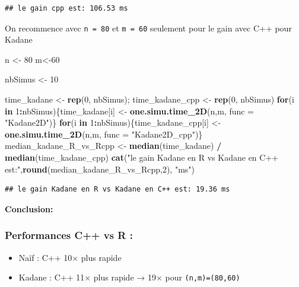 \documentclass[
]{article}
\newenvironment{Shaded}{\begin{snugshade}}{\end{snugshade}}
\newcommand{\AttributeTok}[1]{\textcolor[rgb]{0.13,0.29,0.53}{#1}}
\newcommand{\ControlFlowTok}[1]{\textcolor[rgb]{0.13,0.29,0.53}{\textbf{#1}}}
\newcommand{\DecValTok}[1]{\textcolor[rgb]{0.00,0.00,0.81}{#1}}
\newcommand{\FunctionTok}[1]{\textcolor[rgb]{0.13,0.29,0.53}{\textbf{#1}}}
\newcommand{\NormalTok}[1]{#1}
\newcommand{\OtherTok}[1]{\textcolor[rgb]{0.56,0.35,0.01}{#1}}
\newcommand{\SpecialCharTok}[1]{\textcolor[rgb]{0.81,0.36,0.00}{\textbf{#1}}}
\newcommand{\StringTok}[1]{\textcolor[rgb]{0.31,0.60,0.02}{#1}}
\providecommand{\tightlist}{%
  \setlength{\itemsep}{0pt}\setlength{\parskip}{0pt}}
\begin{document}
\begin{verbatim}
## le gain cpp est: 106.53 ms
\end{verbatim}

On recommence avec \texttt{n\ =\ 80} et \texttt{m\ =\ 60} seulement pour
le gain avec C++ pour Kadane

\begin{Shaded}
\begin{Highlighting}[]
\NormalTok{n }\OtherTok{\textless{}{-}} \DecValTok{80}
\NormalTok{m}\OtherTok{\textless{}{-}}\DecValTok{60}

\NormalTok{nbSimus }\OtherTok{\textless{}{-}} \DecValTok{10}

\NormalTok{time\_kadane }\OtherTok{\textless{}{-}} \FunctionTok{rep}\NormalTok{(}\DecValTok{0}\NormalTok{, nbSimus); time\_kadane\_cpp }\OtherTok{\textless{}{-}} \FunctionTok{rep}\NormalTok{(}\DecValTok{0}\NormalTok{, nbSimus)}
\ControlFlowTok{for}\NormalTok{(i }\ControlFlowTok{in} \DecValTok{1}\SpecialCharTok{:}\NormalTok{nbSimus)\{time\_kadane[i] }\OtherTok{\textless{}{-}} \FunctionTok{one.simu.time\_2D}\NormalTok{(n,m, }\AttributeTok{func =} \StringTok{"Kadane2D"}\NormalTok{)\}}
\ControlFlowTok{for}\NormalTok{(i }\ControlFlowTok{in} \DecValTok{1}\SpecialCharTok{:}\NormalTok{nbSimus)\{time\_kadane\_cpp[i] }\OtherTok{\textless{}{-}} \FunctionTok{one.simu.time\_2D}\NormalTok{(n,m, }\AttributeTok{func =} \StringTok{"Kadane2D\_cpp"}\NormalTok{)\}}
\NormalTok{median\_kadane\_R\_vs\_Rcpp }\OtherTok{\textless{}{-}} \FunctionTok{median}\NormalTok{(time\_kadane) }\SpecialCharTok{/} \FunctionTok{median}\NormalTok{(time\_kadane\_cpp)}
\FunctionTok{cat}\NormalTok{(}\StringTok{"le gain Kadane en R vs Kadane en C++ est:"}\NormalTok{,}\FunctionTok{round}\NormalTok{(median\_kadane\_R\_vs\_Rcpp,}\DecValTok{2}\NormalTok{), }\StringTok{"ms"}\NormalTok{)}
\end{Highlighting}
\end{Shaded}

\begin{verbatim}
## le gain Kadane en R vs Kadane en C++ est: 19.36 ms
\end{verbatim}

\textbf{Conclusion:}

\subsubsection{Performances C++ vs R :}\label{performances-c-vs-r}

\begin{itemize}
\tightlist
\item
  Naïf : C++ 10× plus rapide\\
\item
  Kadane : C++ 11× plus rapide → 19× pour \texttt{(n,m)=(80,60)}
\end{itemize}
\end{document}
